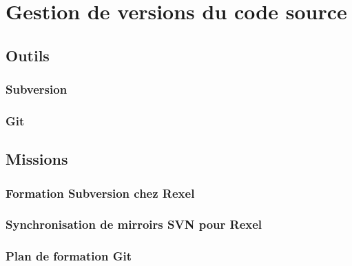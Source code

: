 \section{Gestion de versions du code source}
\label{section:pic-source}

\subsection{Outils}

\subsubsection{Subversion}

\subsubsection{Git}

\subsection{Missions}

\subsubsection{Formation Subversion chez Rexel}

\subsubsection{Synchronisation de mirroirs SVN pour Rexel}

\subsubsection{Plan de formation Git}

